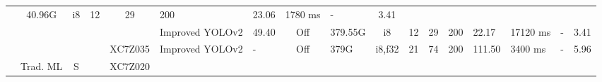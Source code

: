 \documentclass{article}
\begin{document}
\begin{table}
\begin{adjustbox}{totalheight=\baselineskip,}
\begin{tabular}{ccccclp{2em}cp{3em}cp{2em}p{4em}p{3em}p{3.5em}p{3.5em}p{2.5em}p{3em}}
                               &\multirow{1}{*}{40.96G}
                                   &\multirow{1}{*}{i8}
                                       &\multirow{1}{*}{12}
                                           &\multirow{1}{*}{29}
                                               &\multirow{1}{*}{200}
                                                   &\multirow{1}{*}{23.06}
                                                       &\multirow{1}{*}{1780 ms}
                                                           &\multirow{1}{*}{-}
                                                               &\multirow{1}{*}{3.41}\\
   &   &   &   &   &\multirow{1}{*}{Improved YOLOv2}
                       &\multirow{1}{*}{49.40}
                           &\multirow{1}{*}{Off}
                               &\multirow{1}{*}{379.55G}
                                   &\multirow{1}{*}{i8}
                                       &\multirow{1}{*}{12}
                                           &\multirow{1}{*}{29}
                                               &\multirow{1}{*}{200}
                                                   &\multirow{1}{*}{22.17}
                                                       &\multirow{1}{*}{17120 ms}
                                                           &\multirow{1}{*}{-}
                                                               &\multirow{1}{*}{3.41}\\
\cmidrule{4-17}
   &   &   &\multirow{1}{*}{\cite{zhangFPGAImplementationCNNbased2021a}}
               &\multirow{1}{*}{XC7Z035}
                   &\multirow{1}{*}{Improved YOLOv2}
                       &\multirow{1}{*}{-}
                           &\multirow{1}{*}{Off}
                               &\multirow{1}{*}{379G}
                                   &\multirow{1}{*}{i8,f32}
                                       &\multirow{1}{*}{21}
                                           &\multirow{1}{*}{74}
                                               &\multirow{1}{*}{200}
                                                   &\multirow{1}{*}{111.50}
                                                       &\multirow{1}{*}{3400 ms}
                                                           &\multirow{1}{*}{-}
                                                               &\multirow{1}{*}{5.96}\\
\cmidrule{2-17}
   &\multirow{7}{*}{Trad. ML}
       &\multirow{7}{*}{S}
           &\multirow{1}{*}{\cite{fraczekEmbeddedVisionSystem2018}}
               &\multirow{1}{*}{XC7Z020}

\end{tabular}
\end{adjustbox}
\end{table}
\end{document}
